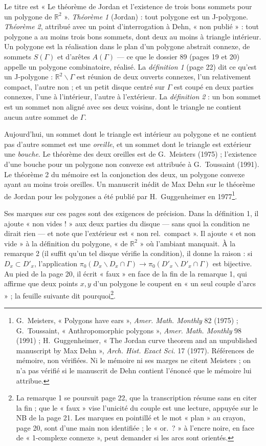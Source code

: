\documentclass[11pt,a4paper]{article}
\begin{document}
Le titre est « Le théorème de Jordan et l'existence de trois bons sommets pour
un polygone de $\mathbb{R}^2$ ». \emph{Théorème 1} (Jordan) : tout polygone
est un J-polygone. \emph{Théorème 2}, attribué avec un point d'interrogation à
Dehn, « non publié » : tout polygone a au moins trois bons sommets, dont deux au
moins à triangle intérieur. Un polygone est la réalisation dans le plan d'un
polygone abstrait connexe, de sommets $S(\Gamma)$ et d'arêtes $A(\Gamma)$ — ce
que le dossier 89 (pages 19 et 20) appelle un polygone combinatoire, réalisé.
La \emph{définition 1} (page 22) dit ce qu'est un J-polygone : $\mathbb{R}^2
\smallsetminus \Gamma$ est réunion de deux ouverts connexes, l'un relativement
compact, l'autre non ; et un petit disque centré sur $\Gamma$ est coupé en deux
parties connexes, l'une à l'intérieur, l'autre à l'extérieur. La
\emph{définition 2} : un bon sommet est un sommet non aligné avec ses deux
voisins, dont le triangle ne contient aucun autre sommet de $\Gamma$.

Aujourd'hui, un sommet dont le triangle est intérieur au polygone et ne
contient pas d'autre sommet est une \emph{oreille}, et un sommet dont le
triangle est extérieur une \emph{bouche}. Le théorème des deux oreilles est de
G.~Meisters (1975) ; l'existence d'une bouche pour un polygone non convexe est
attribuée à G.~Toussaint (1991). Le théorème 2 du mémoire est la conjonction des
deux, un polygone convexe ayant au moins trois oreilles. Un manuscrit inédit de
Max Dehn sur le théorème de Jordan pour les polygones a été publié par
H.~Guggenheimer en 1977\footnote{G.~Meisters, « Polygons have ears »,
\emph{Amer. Math. Monthly} 82 (1975) ; G.~Toussaint, « Anthropomorphic
polygons », \emph{Amer. Math. Monthly} 98 (1991) ; H.~Guggenheimer, « The
Jordan curve theorem and an unpublished manuscript by Max Dehn », \emph{Arch.
Hist. Exact Sci.} 17 (1977). Références de mémoire, non vérifiées. Ni le mémoire
ni ses marges ne citent Meisters ; on n'a pas vérifié si le manuscrit de Dehn
contient l'énoncé que le mémoire lui attribue.}.

Ses marques sur ces pages sont des exigences de précision. Dans la définition
1, il ajoute « non vides ! » aux deux parties du disque — sans quoi la
condition ne dirait rien — et note que l'extérieur est « non rel.\ compact ».
Il ajoute « et non vide » à la définition du polygone, « de $\mathbb{R}^2$ »
où l'ambiant manquait. À la remarque 2 (il suffit qu'un tel disque vérifie la
condition), il donne la raison : si $D_x \subset D'_x$, l'application $\pi_0(D_x
\smallsetminus D_x \cap \Gamma) \to \pi_0(D'_x \smallsetminus D'_x \cap
\Gamma)$ est bijective. Au pied de la page 20, il écrit « faux » en face de la
fin de la remarque 1, qui affirme que deux points $x, y$ d'un polygone le
coupent en « un seul couple d'arcs » ; la feuille suivante dit
pourquoi\footnote{La remarque 1 se poursuit page 22, que la transcription
résume sans en citer la fin ; que le « faux » vise l'unicité du couple est une
lecture, appuyée sur le NB de la page 21. Les marques en pointillé et le mot
« plan » au crayon, page 20, sont d'une main non identifiée ; le « or.\ ? »
à l'encre noire, en face de « 1-complexe connexe », peut demander si les arcs
sont orientés.}.
\end{document}
